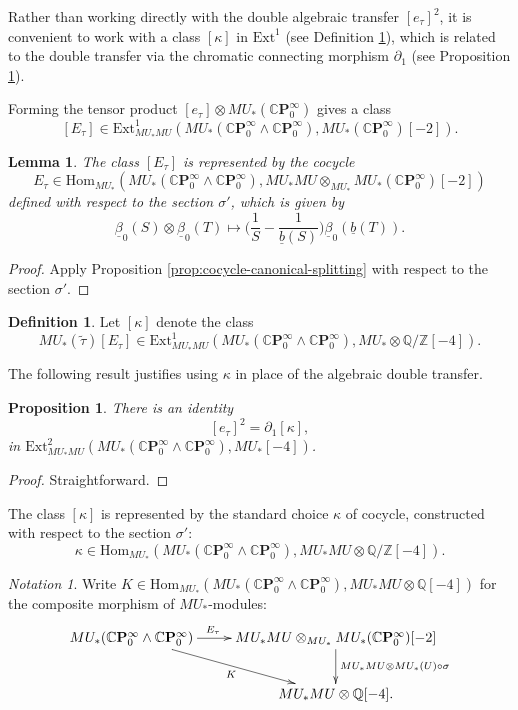 \documentclass[10pt,a4paper]{amsart}
\newtheorem{prop}[thm]{Proposition}
\newtheorem{lem}[thm]{Lemma}
\theoremstyle{definition}
\newtheorem{defn}[thm]{Definition}
\theoremstyle{remark}
\newtheorem{nota}[thm]{Notation}
\newcommand{\qz}{{\rat/\zed}}
\renewcommand{\hom}{\mathrm{Hom}}
\newcommand{\ext}{\mathrm{Ext}}
\newcommand{\zed}{\mathbb{Z}}
\newcommand{\rat}{\mathbb{Q}}
\newcommand{\cp}{\mathbb{C} \mathbf{P}^\infty}
\renewcommand{\smash}{\wedge}
\begin{document}
Rather than working directly with the double algebraic transfer $[e_\tau]^2$, it is convenient to
work with a  class $[\kappa]$ in $\ext^1$ (see Definition \ref{def:kappa}), which is related to
the double transfer  via the chromatic connecting morphism $\partial_1$ (see Proposition \ref{prop:kappa-transfer}).

Forming the tensor product $[e_\tau] \otimes MU_* (\cp_0)$ gives a
class
\[
[E_\tau ]\in \ext^1_{MU_* MU}(MU_* (\cp_0 \smash \cp_0),MU_*(\cp_0) [-2]).
\]

\begin{lem}
\label{lem:Etau}
The class $[E_\tau]$ is represented by the cocycle
\[
{E_\tau} \in \hom_{MU_*}(MU_* (\cp_0\smash \cp_0), MU_* MU\otimes _{MU_*} MU_* (\cp_0)[-2])
\]
defined with respect to the section $\sigma'$,  which is given by
\[
 \underline{\beta}_ 0 (S) \otimes \underline{\beta}_0 (T)
\mapsto
\Big(
\frac{1}{S}
- \frac{1}{\underline{b}(S)}
\Big)
\underline{\beta}_0 (\underline{b}(T)).
\]
\end{lem}

\begin{proof}
Apply Proposition \ref{prop:cocycle-canonical-splitting} with respect to the section $\sigma'$.
\end{proof}

\begin{defn}
\label{def:kappa}
	Let $[\kappa]$ denote the class
\[
MU_* (\tilde{\tau}) [E_\tau] \in \ext^1
_{MU_* MU} (MU_* (\cp_0 \smash \cp_0), MU_* \otimes \qz[-4]).
\]
\end{defn}

The following result justifies using $\kappa$ in place of the algebraic double transfer.


\begin{prop}
 \label{prop:kappa-transfer}
There is an identity
\[
 [e_\tau]^2 = \partial_1 [\kappa],
\]
in $\ext^2 _{MU_*MU}(MU_* (\cp_0 \smash \cp_0), MU_* [-4])$.
\end{prop}

\begin{proof}
 Straightforward.
\end{proof}



The class $[\kappa]$ is represented by the standard choice  $\kappa$ of cocycle, constructed with respect
to the section $\sigma'$:
\[
{\kappa} \in \hom_{MU_*} ( MU_* (\cp_0\smash \cp_0),MU_*MU \otimes \qz [-4]).
\]



\begin{nota}
\label{nota:Xi}
	Write $K \in \hom_{MU_*} (MU_* (\cp_0\smash \cp_0), MU_*MU \otimes
\rat [-4])$ for the composite  morphism  of $MU_*$-modules:
\[
	\xymatrix{
MU_* (\cp_0 \smash \cp_0)
\ar[r]^(.4){E_\tau}
\ar[rd]_K
&
MU_* MU\otimes _{MU_*}MU_*(\cp_{0})[-2]
\ar[d]^{MU_*MU \otimes MU_*(U) \circ \sigma }
\\
&
MU_*MU \otimes \rat [-4].
}
\]
\end{nota}
\end{document}
